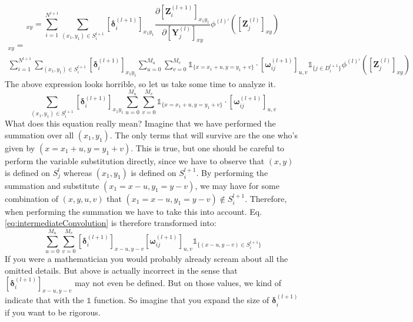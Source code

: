 \documentclass[a4paper,10pt]{article}
\theoremstyle{definition}
\begin{document}
\begin{equation}
[\pmb{\delta}_j^{(l)}]_{xy} = \sum_{i = 1}^{N^{l+1}}\sum_{(x_1,y_1) \in S^{l+1}_i} [\pmb{\delta}^{(l+1)}_i]_{x_1y_1} \frac{\partial [\pmb{Z}^{(l + 1)}_{i}]_{x_1y_1}}{\partial [\pmb{Y}^{(l)}_j]_{xy}} \phi^{(l)'}([\pmb{Z}^{(l)}_{j}]_{xy})
\end{equation}
\begin{gather}
[\pmb{\delta}_j^{(l)}]_{xy} = \\
\sum_{i = 1}^{N^{l+1}}\sum_{(x_1,y_1) \in S^{l+1}_i} [\pmb{\delta}^{(l+1)}_i]_{x_1y_1} \sum_{u = 0}^{M_u} \sum_{v = 0}^{M_v} \mathds{1}_{\{x = x_1 + u, y = y_1 + v\}} \cdot [\pmb{\omega}_{ij}^{(l+1)}]_{u,v}\mathds{1}_{\{j \in D^{l+1}_i\}} \phi^{(l)'}([\pmb{Z}^{(l)}_{j}]_{xy})
\label{eq:horrible}
\end{gather}
The above expression looks horrible, so let us take some time to analyze it.
\begin{equation}
\sum_{(x_1,y_1) \in S^{l+1}_i} [\pmb{\delta}^{(l+1)}_i]_{x_1y_1} \sum_{u = 0}^{M_u} \sum_{v = 0}^{M_v} \mathds{1}_{\{x = x_1 + u, y = y_1 + v\}} \cdot [\pmb{\omega}_{ij}^{(l+1)}]_{u,v}
\label{eq:intermediateConvolution}
\end{equation}
What does this equation really mean? Imagine that we have performed the summation over all $(x_1, y_1)$. The only terms that will survive are the one who's given by $(x = x_1 + u, y = y_1 + v)$. This is true, but one should be careful to perform the variable substitution directly, since we have to observe that $(x,y)$ is defined on $S^l_j$ whereas $(x_1, y_1)$ is defined on $S_i^{l+1}$. By performing the summation and substitute $(x_1 = x-u, y_1 = y-v)$, we may have for some combination of $(x,y,u,v)$ that $(x_1 = x-u, y_1 = y-v) \notin S_i^{l+1}$. Therefore, when performing the summation we have to take this into account. Eq. \ref{eq:intermediateConvolution} is therefore transformed into:
\begin{equation}
\sum_{u = 0}^{M_u} \sum_{v = 0}^{M_v}  [\pmb{\delta}^{(l+1)}_i]_{x - u,y - v}  [\pmb{\omega}_{ij}^{(l+1)}]_{u,v} \mathds{1}_{\{(x - u, y - v) \in S^{l+1}_i\}}
\label{eq:simplifiedIntermediateConvolution}
\end{equation}
If you were a mathematician you would probably already scream about all the omitted details. But above is actually incorrect in the sense that $[\pmb{\delta}^{(l+1)}_i]_{x - u,y - v}$ may not even be defined. But on those values, we kind of indicate that with the $\mathds{1}$ function. So imagine that you expand the size of $\pmb{\delta}^{(l+1)}_i$ if you want to be rigorous.\\
\end{document}
